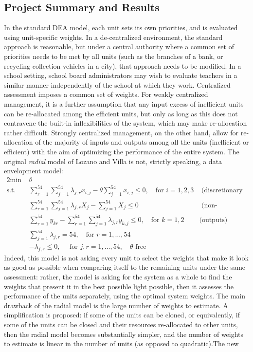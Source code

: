 \subsection*{Project Summary and Results} In the standard DEA model, each unit sets its own priorities, and is evaluated using unit-specific weights. In a de-centralized environment, the standard approach is reasonable, but under a central authority where a common set of priorities needs to be met by all units (such as the branches of a bank, or recycling collection vehicles in a city), that approach needs to be modified. In a school setting, school board administrators may wish to evaluate teachers in a similar manner independently of the school at which they work.
\newl Centralized assessment imposes a common set of weights. For weakly centralized management, it is a further assumption that any input excess of inefficient units can be re-allocated among the efficient units, but only as long as this does not contravene the built-in inflexibilities of the system, which may make re-allocation rather difficult. Strongly centralized management, on the other hand, allow for re-allocation of the majority of inputs and outputs among all the units (inefficient or efficient) with the aim  of optimizing the performance of the entire system.\newl 
The original \textit{radial} model of Lozano and Villa is not, strictly speaking, a data envelopment model:
  \begin{alignat*}{2}
    \text{min }   & \theta & &\  \\
    \text{s.t. } & \sum_{r=1}^{54}\sum_{j=1}^{54} \lambda_{j,r}x_{i,j}-\theta \sum_{j=1}^{54}x_{i,j} \leq 0,  \quad\text{for }i=1,2,3 & \text{ (discretionary inputs)}& \\
    & \sum_{r=1}^{54}\sum_{j=1}^{54} \lambda_{j,r}X_{j}- \sum_{j=1}^{54}X_j \leq 0  &\text{ (non-discretionary input)} & \\
                       & \sum_{r=1}^{54}y_{kr}-\sum_{r=1}^{54}\sum_{j=1}^{54} \lambda_{j,r}y_{k,j}\leq 0, \quad \text{for }k=1,2 & \text{(outputs)}\\
                       & \sum_{j=1}^{54}\lambda_{j,r}=54,\quad \text{for }r=1,\ldots,54 &  &\\
                       & -\lambda_{j,r}\leq 0, \quad\text{ for }j,r=1,\ldots,54, \quad \theta \text{ free} & & 
  \end{alignat*}
Indeed, this model is not asking every unit to select the weights that make it look as good as possible when comparing itself to the remaining units under the same assessment: rather, the model is asking for the system as a whole to find the weights that present it in the best possible light possible, then it assesses the performance of the units separately, using the optimal system weights. \newl The main drawback of the radial model is the large number of weights to estimate. A simplification is proposed: if some of the units can be cloned, or equivalently, if some of the units can be closed and their resources re-allocated to other units, then the radial model becomes substantially simpler, and the number of weights to estimate is linear in the number of units (as opposed to quadratic).\newl The new
